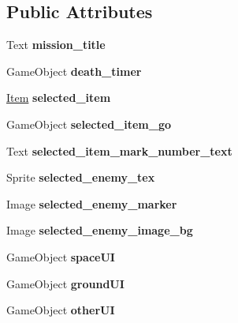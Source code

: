 \subsection*{Public Attributes}
\begin{DoxyCompactItemize}
\item 
\mbox{\label{class_u_i_a6eb93d2e91ef736d8acaac1639cb3a44}} 
Text {\bfseries mission\+\_\+title}
\item 
\mbox{\label{class_u_i_a72e654d2d75b79d3198078c94328eac7}} 
Game\+Object {\bfseries death\+\_\+timer}
\item 
\mbox{\label{class_u_i_a14c650efee412204296227102fa28cc0}} 
\hyperlink{class_item}{Item} {\bfseries selected\+\_\+item}
\item 
\mbox{\label{class_u_i_ad5b38f412e6c4d5b3f78afb24bcbfacd}} 
Game\+Object {\bfseries selected\+\_\+item\+\_\+go}
\item 
\mbox{\label{class_u_i_a014d7e3713cdedcc83a88788b4074450}} 
Text {\bfseries selected\+\_\+item\+\_\+mark\+\_\+number\+\_\+text}
\item 
\mbox{\label{class_u_i_a202642b3ea114e5ba878197933cbbcf7}} 
Sprite {\bfseries selected\+\_\+enemy\+\_\+tex}
\item 
\mbox{\label{class_u_i_a01d65184857c7147fa43731cd54fe86b}} 
Image {\bfseries selected\+\_\+enemy\+\_\+marker}
\item 
\mbox{\label{class_u_i_a1ac49b92364e2dd0ca80ae02bd09d28e}} 
Image {\bfseries selected\+\_\+enemy\+\_\+image\+\_\+bg}
\item 
\mbox{\label{class_u_i_abfee9a58717efcff4ea6d5cd4b18e667}} 
Game\+Object {\bfseries space\+UI}
\item 
\mbox{\label{class_u_i_a55b635e756b044e4da6aec8b0a954a70}} 
Game\+Object {\bfseries ground\+UI}
\item 
\mbox{\label{class_u_i_a5a3eb061814db8bedb56ce7ca68c023f}} 
Game\+Object {\bfseries other\+UI}
\item 

\end{DoxyCompactItemize}
